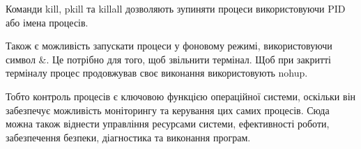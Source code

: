 \documentclass[a4paper,12pt]{article}
\begin{document}
    Команди kill, pkill та killall дозволяють зупиняти процеси використовуючи PID або імена процесів.

    Також є можливість запускати процеси у фоновому режимі, використовуючи символ \&. Це потрібно для того, щоб звільнити термінал.
    Щоб при закритті терміналу процес продовжував своє виконання використовують nohup.

    Тобто контроль процесів є ключовою функцією операційної системи, оскільки він забезпечує можливість моніторингу та керування цих самих процесів.
    Сюда можна також віднести управління ресурсами системи, ефективності роботи, забезпечення безпеки, діагностика та виконання програм.
\end{document}
